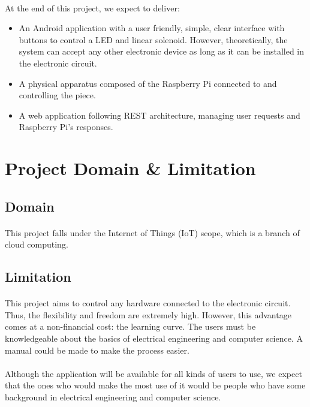 \documentclass[12pt, oneside, a4paper]{book}
\begin{document}
			\paragraph{} At the end of this project, we expect to deliver:
			\begin{itemize}
				\item An Android application with a user friendly, simple, clear interface with buttons to control a LED and linear solenoid. However, theoretically, the system can accept any other electronic device as long as it can be installed in the electronic circuit. 
				\item A physical apparatus composed of the Raspberry Pi connected to and controlling the piece.
				\item A web application following REST architecture, managing user  requests and Raspberry Pi's responses.
			\end{itemize}
		\section{Project Domain \& Limitation}
			\subsection{Domain}
				\paragraph{} This project falls under the Internet of Things (IoT) scope, which is a branch of cloud computing. 
				
				 
			\subsection{Limitation}
			\paragraph{} This project aims to control any hardware connected to the electronic circuit. Thus, the flexibility and freedom are extremely high. However, this advantage comes at a non-financial cost: the learning curve. The users must be knowledgeable about the basics of electrical engineering and computer science. A manual could be made to make the process easier.
			\paragraph{} Although the application will be available for all kinds of users to use, we expect that the ones who would make the most use of it would be people who have some background in electrical engineering and computer science. 
\end{document}
